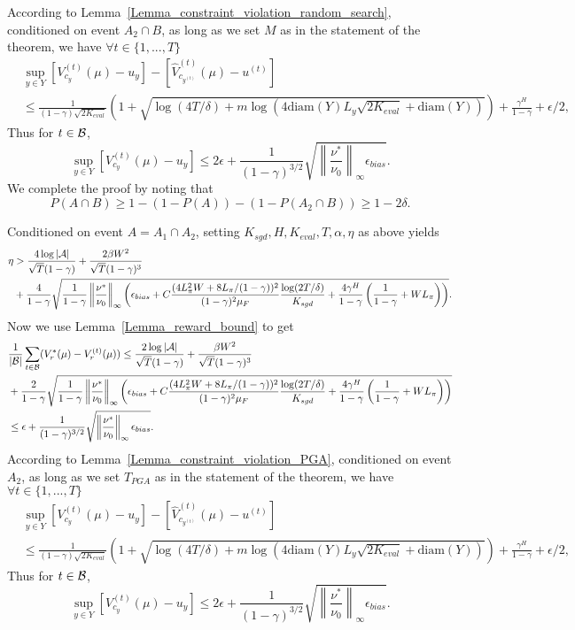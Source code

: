 According to Lemma~\ref{Lemma_constraint_violation_random_search}, conditioned on event $A_2\cap B$, as long as we set $M$ as in the statement of the theorem, we have $\forall t\in\{1,...,T\}$
$$\begin{aligned}
    &\sup_{y\in Y} \left[V_{c_y}^{(t)}(\mu)-u_y\right]-\left[\widehat V_{c_{y^{(t)}}}^{(t)}(\mu)-u^{(t)}\right]\\
    &\leq \frac{1}{(1-\gamma)\sqrt{2K_{eval}}}\left(1+\sqrt{\log{(4T/\delta)}+m\log(4\mathrm{diam}(Y)L_y\sqrt{2K_{eval}}+\mathrm{diam}(Y))}\right)+\frac{\gamma^H}{1-\gamma}+\epsilon/2,
    \end{aligned}$$
Thus for $t\in {\mathcal{B}}$, 
$$ \sup_{y\in Y}\left[V_{c_y}^{(t)}(\mu)-u_y\right]\leq 2\epsilon+\frac{1}{(1-\gamma)^{3/2}}\sqrt{\left\|\frac{\nu^*}{\nu_0}\right\|_\infty\epsilon_{bias}}.
$$
We complete the proof by noting that
$$
P(A\cap B)\geq 1-(1-P(A))-(1-P(A_2\cap B))\geq 1-2\delta.
$$
\endproof

Conditioned on event $A=A_1\cap A_2$, setting $K_{sgd}, H, K_{eval}, T, \alpha, \eta$ as above yields
$$\begin{aligned}
    \eta&> \frac{4\log |{\mathcal{A}}|}{\sqrt{T}(1-\gamma)}+\frac{2\beta W^2}{\sqrt{T}(1-\gamma)^3}\\
    &+\frac{4}{1-\gamma}\sqrt{\frac{1}{1-\gamma}\left\|\frac{\nu^*}{\nu_0}\right\|_\infty\left(\epsilon_{bias}+C\frac{(4L_\pi^2W+8L_\pi/(1-\gamma))^2}{(1-\gamma)^2\mu_F}\frac{\log(2T/\delta)}{K_{sgd}}+\frac{4\gamma^H}{1-\gamma}\left(\frac{1}{1-\gamma}+WL_\pi\right)\right)}.
    \end{aligned}
$$
Now we use Lemma~\ref{Lemma_reward_bound} to get
$$
    \begin{aligned}
        &\frac{1}{|{\mathcal{B}}|}\sum_{t\in{\mathcal{B}}}(V_r^*(\mu)-V_r^{(t)}(\mu)) \leq \frac{2\log|{\mathcal{A}}|}{\sqrt{T}(1-\gamma)}+\frac{\beta W^2}{\sqrt{T}(1-\gamma)^3}\\
       &+\frac{2}{1-\gamma}\sqrt{\frac{1}{1-\gamma}\left\|\frac{\nu^*}{\nu_0}\right\|_\infty\left(\epsilon_{bias}+C\frac{(4L_\pi^2W+8L_\pi/(1-\gamma))^2}{(1-\gamma)^2\mu_F}\frac{\log(2T/\delta)}{K_{sgd}}+\frac{4\gamma^H}{1-\gamma}\left(\frac{1}{1-\gamma}+WL_\pi\right)\right)}\\
       &\leq \epsilon+\frac{1}{(1-\gamma)^{3/2}}\sqrt{\left\|\frac{\nu^*}{\nu_0}\right\|_\infty\epsilon_{bias}}.
    \end{aligned}
    $$
According to Lemma~\ref{Lemma_constraint_violation_PGA}, conditioned on event $A_2$, as long as we set $T_{PGA}$ as in the statement of the theorem, we have $\forall t\in\{1,...,T\}$
$$\begin{aligned}
    &\sup_{y\in Y} \left[V_{c_y}^{(t)}(\mu)-u_y\right]-\left[\widehat V_{c_{y^{(t)}}}^{(t)}(\mu)-u^{(t)}\right]\\
    &\leq \frac{1}{(1-\gamma)\sqrt{2K_{eval}}}\left(1+\sqrt{\log{(4T/\delta)}+m\log(4\mathrm{diam}(Y)L_y\sqrt{2K_{eval}}+\mathrm{diam}(Y))}\right)+\frac{\gamma^H}{1-\gamma}+\epsilon/2,
    \end{aligned}$$
Thus for $t\in {\mathcal{B}}$, 
$$ \sup_{y\in Y}\left[V_{c_y}^{(t)}(\mu)-u_y\right]\leq 2\epsilon+\frac{1}{(1-\gamma)^{3/2}}\sqrt{\left\|\frac{\nu^*}{\nu_0}\right\|_\infty\epsilon_{bias}}.
$$
\endproof


